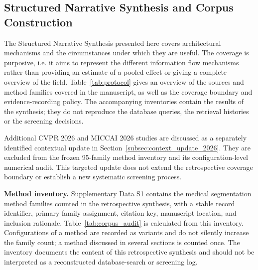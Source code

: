\documentclass[5p,times,authoryear]{elsarticle}
\begin{document}
\subsection{Structured Narrative Synthesis and Corpus Construction}
\label{subsec:sns}

The Structured Narrative Synthesis presented here covers architectural mechanisms and the circumstances under which they are useful. The coverage is purposive, i.e. it aims to represent the different information flow mechanisms rather than providing an estimate of a pooled effect or giving a complete overview of the field. Table~\ref{tab:protocol} gives an overview of the sources and method families covered in the manuscript, as well as the coverage boundary and evidence-recording policy. The accompanying inventories contain the results of the synthesis; they do not reproduce the database queries, the retrieval histories or the screening decisions.

Additional CVPR 2026 and MICCAI 2026 studies are discussed as a separately identified contextual update in Section~\ref{subsec:context_update_2026}. They are excluded from the frozen 95-family method inventory and its configuration-level numerical audit. This targeted update does not extend the retrospective coverage boundary or establish a new systematic screening process.

\noindent\textbf{Method inventory.}
Supplementary Data S1 contains the medical segmentation method families counted in the retrospective synthesis, with a stable record identifier, primary family assignment, citation key, manuscript location, and inclusion rationale. Table~\ref{tab:corpus_audit} is calculated from this inventory. Configurations of a method are recorded as variants and do not silently increase the family count; a method discussed in several sections is counted once. The inventory documents the content of this retrospective synthesis and should not be interpreted as a reconstructed database-search or screening log.
\end{document}
